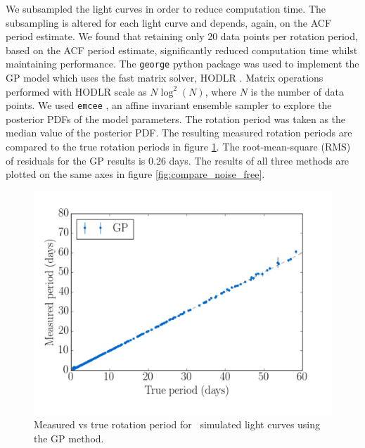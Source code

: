 We subsampled the light curves in order to reduce computation time.
The subsampling is altered for each light curve and depends, again, on the ACF
period estimate.
We found that retaining only 20 data points per rotation period, based on the
ACF period estimate, significantly reduced computation time whilst maintaining
performance.
The {\tt george} \citep{George} python package was used to implement the GP
model which uses the fast matrix solver, HODLR \citep{Ambikasaran2014}.
Matrix operations performed with HODLR scale as $N \log ^2 (N)$, where $N$ is
the number of data points.
We used {\tt emcee} \citep{Foreman-Mackey2013}, an affine invariant ensemble
sampler to explore the posterior PDFs of the model parameters.
The rotation period was taken as the median value of the posterior PDF.
The resulting measured rotation periods are compared to the true rotation
periods in figure \ref{fig:GP_compare_noise_free}.
The root-mean-square (RMS) of residuals for the GP results is 0.26 days.
The results of all three methods are plotted on the same axes in figure
\ref{fig:compare_noise_free}.


\begin{figure}
\begin{center}
\includegraphics[width=6in, clip=true]{figures/compare_gp.pdf}
\caption[GP results.]
{Measured vs true rotation period for \nlightcurves\ simulated light
curves using the GP method.}
\label{fig:GP_compare_noise_free}
\end{center}
\end{figure}

